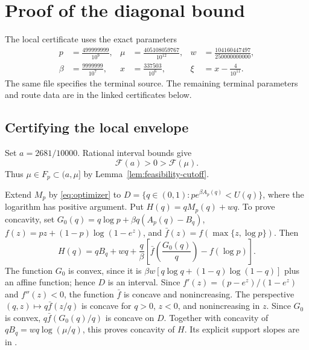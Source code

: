 \section{Proof of the diagonal bound}
\label{sec:concrete-bound}

The local certificate uses the exact parameters
\[
 \begin{aligned}
 p&=\frac{499999999}{10^9},&
 \mu&=\frac{405108059767}{10^{12}},&
 w&=\frac{104160447497}{250000000000},\\
 \beta&=\frac{9999999}{10^7},&
 x&=\frac{337503}{10^6},&
 \xi&=x-\frac4{10^{11}}.
 \end{aligned}
\]
The same file specifies the terminal source. The remaining terminal
parameters and route data are in the linked certificates below.

\subsection{Certifying the local envelope}

Set $a=2681/10000$. Rational interval bounds give
\[
 \mathcal F(a)>0>\mathcal F(\mu).
\]
Thus $\mu\in F_p\subset(a,\mu]$ by Lemma~\ref{lem:feasibility-cutoff}.

Extend $M_p$ by \eqref{eq:optimizer} to
$D=\{q\in(0,1):p e^{\beta A_p(q)}<U(q)\}$, where the logarithm has
positive argument. Put $H(q)=qM_p(q)+wq$. To prove concavity, set
$G_0(q)=q\log p+\beta q(A_p(q)-B_q)$,
$f(z)=pz+(1-p)\log(1-e^z)$, and
$\bar f(z)=f(\max\{z,\log p\})$. Then
\[
 H(q)=qB_q+wq+
 \frac q\beta\left[\bar f\left(\frac{G_0(q)}q\right)-f(\log p)\right].
\]
The function $G_0$ is convex, since it is
$\beta w[q\log q+(1-q)\log(1-q)]$ plus an affine function;
hence $D$ is an interval. Since $f'(z)=(p-e^z)/(1-e^z)$ and
$f''(z)<0$, the function $\bar f$ is concave and nonincreasing.
The perspective $(q,z)\mapsto q\bar f(z/q)$ is concave for
$q>0$, $z<0$, and nonincreasing in $z$. Since $G_0$ is convex,
$q\bar f(G_0(q)/q)$ is concave on $D$.
Together with concavity of $qB_q=wq\log(\mu/q)$, this proves concavity of $H$.
Its explicit support slopes are in
.


